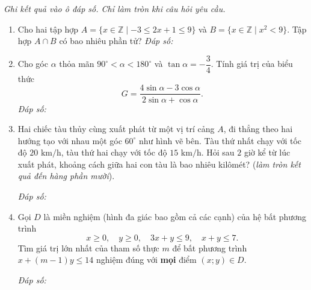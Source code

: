 \documentclass[12pt,a4paper]{article}
\newcommand{\parttitle}[1]{\par\vspace{3pt}{\large\bfseries\color{ink}#1}\par\vspace{2pt}}
\newcommand{\answerbox}{\hfill\textit{Đáp số:}\ \fbox{\rule{0pt}{13pt}\hspace{2.2cm}}}
\begin{document}
\par\vspace{8pt}
\parttitle{PHẦN III. Trả lời ngắn}
\textit{Ghi kết quả vào ô đáp số. Chỉ làm tròn khi câu hỏi yêu cầu.}
\begin{enumerate}
\item Cho hai tập hợp $A = \{x \in \mathbb{Z} \mid -3 \leq 2x + 1 \leq 9\}$ và $B = \{x \in \mathbb{Z} \mid x^2 < 9\}$. Tập hợp $A \cap B$ có bao nhiêu phần tử?
\answerbox
\item Cho góc $\alpha$ thỏa mãn $90^\circ < \alpha < 180^\circ$ và $\tan\alpha = -\dfrac{3}{4}$. Tính giá trị của biểu thức
\[
G = \frac{4\sin\alpha - 3\cos\alpha}{2\sin\alpha + \cos\alpha}.
\]
\answerbox
\item \begin{minipage}[t]{0.52\linewidth}
Hai chiếc tàu thủy cùng xuất phát từ một vị trí cảng $A$, đi thẳng theo hai hướng tạo với nhau một góc $60^\circ$ như hình vẽ bên. Tàu thứ nhất chạy với tốc độ $20\text{ km/h}$, tàu thứ hai chạy với tốc độ $15\text{ km/h}$. Hỏi sau $2$ giờ kể từ lúc xuất phát, khoảng cách giữa hai con tàu là bao nhiêu kilômét? (\textit{làm tròn kết quả đến hàng phần mười}).
\par\vspace{4pt}\answerbox
\end{minipage}\hfill%
\begin{minipage}[t]{0.46\linewidth}
\vspace{-0.4\baselineskip}
\centering
{}
\end{minipage}
\item Gọi $D$ là miền nghiệm (hình đa giác bao gồm cả các cạnh) của hệ bất phương trình
\[
x \geq 0,\quad y \geq 0,\quad 3x + y \leq 9,\quad x + y \leq 7.
\]
Tìm giá trị lớn nhất của tham số thực $m$ để bất phương trình $x + (m - 1)y \leq 14$ nghiệm đúng với \textbf{mọi} điểm $(x; y) \in D$.
\par\answerbox
\end{enumerate}
\end{document}
